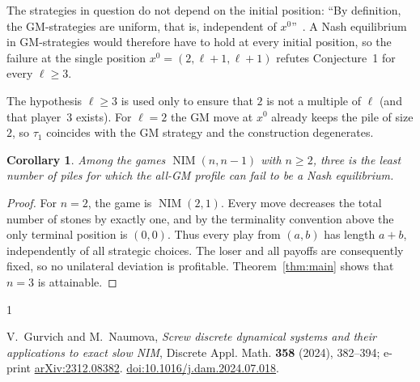 \documentclass[11pt]{amsart}
\newtheorem{corollary}[theorem]{Corollary}
\newcommand{\NIM}{\operatorname{NIM}}
\begin{document}
The strategies in question do not depend on the initial position: ``By
definition, the GM-strategies are uniform, that is, independent of
$x^0$''~\cite[Section~6.5]{GN}. A Nash equilibrium in GM-strategies
would therefore have to hold at every initial position, so the failure
at the single position $x^0=(2,\ell+1,\ell+1)$ refutes Conjecture~1 for
every $\ell\ge 3$.

The hypothesis $\ell\ge 3$ is used only to ensure that $2$ is not a
multiple of $\ell$ (and that player~3 exists). For $\ell=2$ the GM move
at $x^0$ already keeps the pile of size $2$, so $\tau_1$ coincides with
the GM strategy and the construction degenerates.

\begin{corollary}\label{cor:minimal}
Among the games $\NIM(n,n-1)$ with $n\ge 2$, three is the least number
of piles for which the all-GM profile can fail to be a Nash equilibrium.
\end{corollary}

\begin{proof}
For $n=2$, the game is $\NIM(2,1)$. Every move decreases the total
number of stones by exactly one, and by the terminality convention
above the only terminal position is $(0,0)$. Thus
every play from $(a,b)$ has length $a+b$, independently of all
strategic choices. The loser and all payoffs are consequently fixed,
so no unilateral deviation is profitable. Theorem~\ref{thm:main}
shows that $n=3$ is attainable.
\end{proof}

\begin{thebibliography}{1}

V.~Gurvich and M.~Naumova,
\emph{Screw discrete dynamical systems and their applications to exact
slow NIM},
Discrete Appl. Math. \textbf{358} (2024), 382--394;
e-print \href{https://arxiv.org/abs/2312.08382}{arXiv:2312.08382}.
\href{https://doi.org/10.1016/j.dam.2024.07.018}
{doi:10.1016/j.dam.2024.07.018}.

\end{thebibliography}
\end{document}
